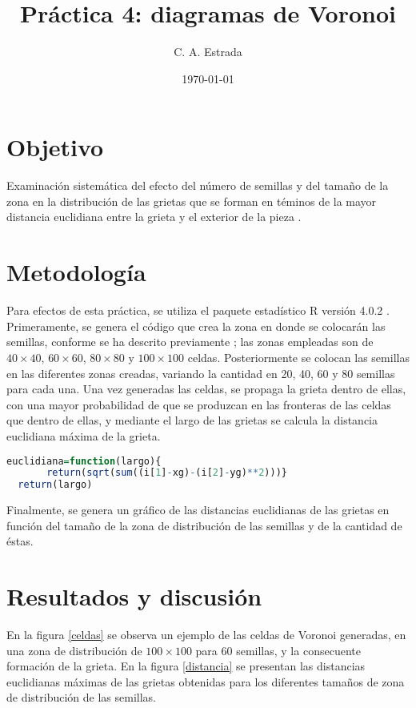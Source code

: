\documentclass{article}
\title{\bf Práctica 4: diagramas de Voronoi}
\date{\today}
\author{C. A. Estrada}
\begin{document}
\maketitle

\section{Objetivo}
Examinación sistemática del efecto del número de semillas y del tamaño de la zona en la distribución de las grietas que se forman en téminos de la mayor distancia euclidiana entre la grieta y el exterior de la pieza \cite{dra}.

\section{Metodología}
Para efectos de esta práctica, se utiliza el paquete estadístico R versión 4.0.2 \cite{R}. Primeramente, se genera el código que crea la zona en donde se colocarán las semillas, conforme se ha descrito previamente \cite{dra}; las zonas empleadas son de $40\times40$, $60\times60$, $80\times80$ y $100\times100$ celdas. Posteriormente se colocan las semillas en las diferentes zonas creadas, variando la cantidad en 20, 40, 60 y 80 semillas para cada una. Una vez generadas las celdas, se propaga la grieta dentro de ellas, con una mayor probabilidad de que se produzcan en las fronteras de las celdas que dentro de ellas, y mediante el largo de las grietas se calcula la distancia euclidiana máxima de la grieta. 
\begin{lstlisting}[language=R]
  euclidiana=function(largo){
       return(sqrt(sum((i[1]-xg)-(i[2]-yg)**2)))}
  return(largo)
\end{lstlisting}
Finalmente, se genera un gráfico de las distancias euclidianas de las grietas en función del tamaño de la zona de distribución de las semillas y de la cantidad de éstas.

\section{Resultados y discusión}
En la figura \ref{celdas} se observa un ejemplo de las celdas de Voronoi generadas, en una zona de distribución de $100\times100$ para 60 semillas, y la consecuente formación de la grieta. En la figura \ref{distancia} se presentan las distancias euclidianas máximas de las grietas obtenidas para los diferentes tamaños de zona de distribución de las semillas. 
\end{document}
